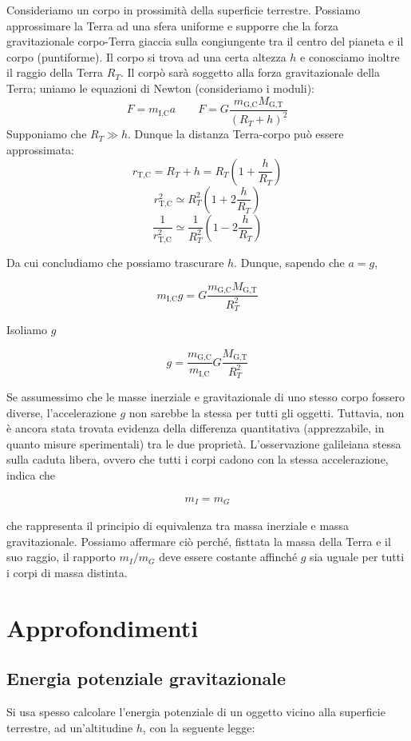 Consideriamo un corpo in prossimità della superficie terrestre. Possiamo approssimare
la Terra ad una sfera uniforme e supporre che la forza gravitazionale corpo-Terra
giaccia sulla congiungente tra il centro del pianeta e il corpo (puntiforme). Il
corpo si trova ad una certa altezza $h$ e conosciamo inoltre il raggio della Terra
$R_T$. Il corpò sarà soggetto alla forza gravitazionale della Terra; uniamo le
equazioni di Newton (consideriamo i moduli):
\[ F = m_\text{I,C}a \qquad F = G\frac{m_\text{G,C}M_\text{G,T}}{(R_{T} + h)^2} \]
Supponiamo che $R_T \gg h$. Dunque la distanza Terra-corpo può essere approssimata:
\[ r_\text{T,C} = R_T + h = R_T\left(1 + \frac{h}{R_T}\right) \]
\[ r_\text{T,C}^2 \simeq R_T^2\left( 1 + 2\frac{h}{R_T} \right) \]
\[ \frac{1}{r_\text{T,C}^2} \simeq \frac{1}{R_T^2}\left( 1 - 2\frac{h}{R_T} \right) \]

\noindent Da cui concludiamo che possiamo trascurare $h$. Dunque, sapendo che
$a = g$,

\[ m_\text{I,C}g = G\frac{m_\text{G,C}M_\text{G,T}}{R_{T}^2} \]

\noindent Isoliamo $g$

\[ g = \frac{m_\text{G,C}}{m_\text{I,C}}G\frac{M_\text{G,T}}{R_{T}^2} \]

\noindent Se assumessimo che le masse inerziale e gravitazionale di uno stesso corpo
fossero diverse, l'accelerazione $g$ non sarebbe la stessa per tutti gli oggetti. Tuttavia,
non è ancora stata trovata evidenza della differenza quantitativa (apprezzabile, in
quanto misure sperimentali) tra le due proprietà. L'osservazione galileiana stessa
sulla caduta libera, ovvero che tutti i corpi cadono con la stessa accelerazione,
indica che

\begin{align}
    m_I = m_G
\end{align}

\noindent che rappresenta il principio di equivalenza tra massa inerziale e massa
gravitazionale. Possiamo affermare ciò perché,
fisttata la massa della Terra e il suo raggio,
il rapporto $m_I/m_G$ deve essere costante
affinché $g$ sia uguale per tutti i corpi di massa distinta.

\section{Approfondimenti}

\subsection{Energia potenziale gravitazionale}
Si usa spesso calcolare l'energia potenziale di un oggetto vicino alla superficie
terrestre, ad un'altitudine $h$, con la seguente legge:

